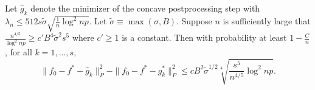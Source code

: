 





\begin{theorem}
\label{thm:concave_consistent}
Let $\hat{g}_k$ denote the minimizer of the concave postprocessing
step with $\lambda_n \leq 512 s\tilde{\sigma} \sqrt{\frac{1}{n} \log^2 np}$. Let $\tilde{\sigma} \equiv \max(\sigma, B)$.
Suppose $n$ is sufficiently large that $\frac{n^{4/5}}{\log^2 np} \geq c' B^4 \tilde{\sigma}^2 s^5$ where $c' \geq 1$ is a constant.
Then with probability at least $1- \frac{C}{n}$, for all $k=1,...,s$,
\[
\| f_0 - f^* - \hat{g}_k \|_P^2 - \| f_0 - f^* - g^*_k \|_P^2 \leq  c B^2 \tilde{\sigma}^{1/2} \sqrt[4]{ \frac{s^5}{n^{4/5}} \log^2 np}.
\]
\end{theorem}

